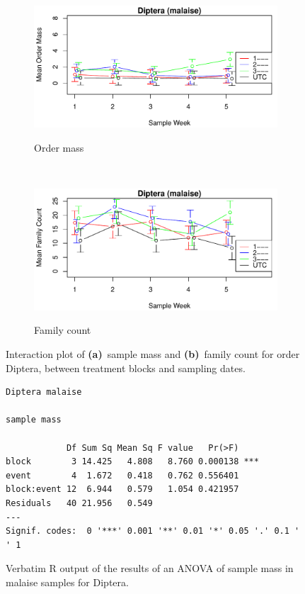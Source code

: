\documentclass[10pt,letterpaper,twocolumn]{article}
\begin{document}
\begin{figure}[h]
	\centering
	\begin{subfigure}[b]{0.45\textwidth}
		\caption{Order mass}
		\includegraphics[width=\textwidth]{plots/blocks/interaction/mass/mass_malaise_Diptera_interplot.pdf}
		\label{fig:malaise_diptera_mass_interplot}
	\end{subfigure}
	~
	\begin{subfigure}[b]{0.45\textwidth}
		\caption{Family count}
		\includegraphics[width=\textwidth]{plots/blocks/interaction/family/family_malaise_Diptera_interplot.pdf}
		\label{fig:malaise_diptera_family_interplot}
	\end{subfigure}
	\caption{Interaction plot of \textbf{(a)}~sample mass and \textbf{(b)}~family count for order Diptera, between treatment blocks and sampling dates.}
	\label{fig:malaise_diptera_interplot}
	\smallskip
	\nointerlineskip
	\hrulefill
\end{figure}

\begin{figure}[h]
	\lstset{numbers=left}
	\lstset{xleftmargin=5mm,framexleftmargin=5mm}
	\begin{lstlisting}
Diptera malaise 

sample mass 

            Df Sum Sq Mean Sq F value   Pr(>F)    
block        3 14.425   4.808   8.760 0.000138 ***
event        4  1.672   0.418   0.762 0.556401    
block:event 12  6.944   0.579   1.054 0.421957    
Residuals   40 21.956   0.549                     
---
Signif. codes:  0 '***' 0.001 '**' 0.01 '*' 0.05 '.' 0.1 ' ' 1
	\end{lstlisting}
	\caption{Verbatim R output of the results of an ANOVA of sample mass in malaise samples for Diptera.}
	\label{fig:malaise_diptera_mass_anova}
	\smallskip
	\nointerlineskip
	\hrulefill
\end{figure}
\end{document}
